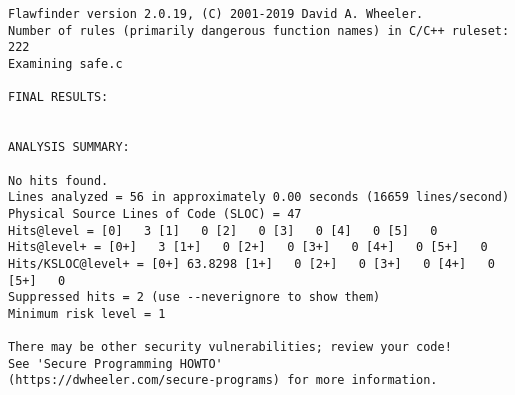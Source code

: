 \documentclass{article}
\begin{document}
\begin{verbatim}
Flawfinder version 2.0.19, (C) 2001-2019 David A. Wheeler.
Number of rules (primarily dangerous function names) in C/C++ ruleset: 222
Examining safe.c

FINAL RESULTS:


ANALYSIS SUMMARY:

No hits found.
Lines analyzed = 56 in approximately 0.00 seconds (16659 lines/second)
Physical Source Lines of Code (SLOC) = 47
Hits@level = [0]   3 [1]   0 [2]   0 [3]   0 [4]   0 [5]   0
Hits@level+ = [0+]   3 [1+]   0 [2+]   0 [3+]   0 [4+]   0 [5+]   0
Hits/KSLOC@level+ = [0+] 63.8298 [1+]   0 [2+]   0 [3+]   0 [4+]   0 [5+]   0
Suppressed hits = 2 (use --neverignore to show them)
Minimum risk level = 1

There may be other security vulnerabilities; review your code!
See 'Secure Programming HOWTO'
(https://dwheeler.com/secure-programs) for more information.
\end{verbatim}
\end{document}
